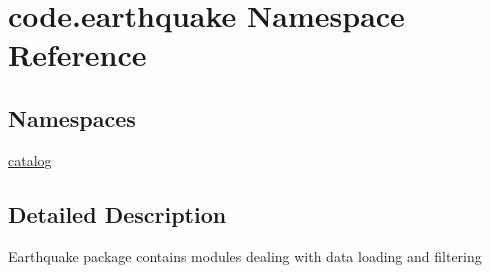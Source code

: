 \hypertarget{namespacecode_1_1earthquake}{}\section{code.\+earthquake Namespace Reference}
\label{namespacecode_1_1earthquake}
\subsection*{Namespaces}
\begin{DoxyCompactItemize}
\item 
 \hyperlink{namespacecode_1_1earthquake_1_1catalog}{catalog}
\end{DoxyCompactItemize}


\subsection{Detailed Description}
\begin{DoxyVerb}Earthquake package contains modules dealing with data loading and filtering
\end{DoxyVerb}
 